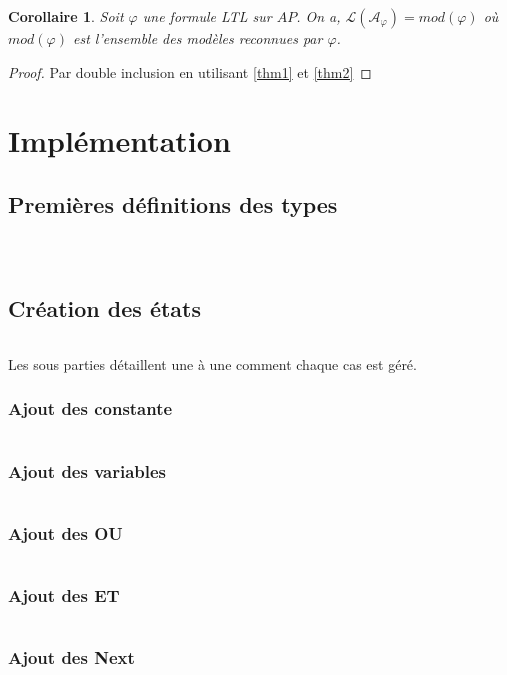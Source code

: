 \documentclass[12pt,a4paper]{article}
\theoremstyle{plain}
\newtheorem{cor}[thm]{Corollaire}
\theoremstyle{definition}
\begin{document}
\begin{cor}
	Soit $\varphi$ une formule LTL sur $AP$. On a, $\mathcal{L}(\mathcal{A}_\varphi)=mod(\varphi)$ où $mod(\varphi)$ est l'ensemble des modèles reconnues par $\varphi$.
\end{cor}
\begin{proof}
	Par double inclusion en utilisant \cref{thm1} et \cref{thm2}
\end{proof}

\section{Implémentation}
\subsection{Premières définitions des types}
\inputminted[firstline=3, lastline=10]{ocaml}{prototype/ltl.ml}
\inputminted[firstline=3, lastline=3]{ocaml}{prototype/buchi.ml}
\inputminted[firstline=33, lastline=42]{ocaml}{prototype/buchi.ml}

\subsection{Création des états}
\inputminted[firstline=120, lastline=136]{ocaml}{prototype/buchi.ml}
Les sous parties détaillent une à une comment chaque cas est géré.
\subsubsection{Ajout des constante}
\inputminted[firstline=44, lastline=48]{ocaml}{prototype/buchi.ml}
\subsubsection{Ajout des variables}
\inputminted[firstline=50, lastline=59]{ocaml}{prototype/buchi.ml}
\subsubsection{Ajout des OU}
\inputminted[firstline=61, lastline=74]{ocaml}{prototype/buchi.ml}
\subsubsection{Ajout des ET}
\inputminted[firstline=76, lastline=89]{ocaml}{prototype/buchi.ml}
\subsubsection{Ajout des Next}
\inputminted[firstline=91, lastline=99]{ocaml}{prototype/buchi.ml}
\end{document}
